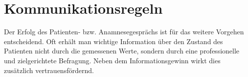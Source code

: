 





\section{Kommunikationsregeln}
\label{topic:kommunikationsregeln}

Der Erfolg des Patienten- bzw. Anamnesegesprächs ist für das
weitere Vorgehen entscheidend. Oft erhält man wichtige
Information über den Zustand des Patienten nicht durch die
gemessenen Werte, sondern durch eine professionelle und
zielgerichtete Befragung. Neben dem Informationsgewinn wirkt dies zusätzlich
vertrauensfördernd.

